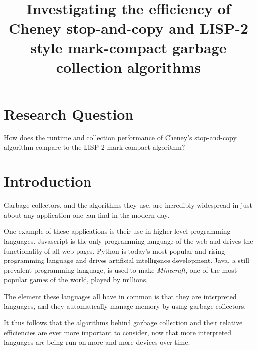 \documentclass[index]{subfiles}
\begin{document}
\title{Investigating the efficiency of Cheney stop-and-copy and LISP-2 style mark-compact garbage collection algorithms}
\date{}
\author{}
\maketitle

\section{Research Question}

How does the runtime and collection performance of Cheney's stop-and-copy algorithm compare to the LISP-2 mark-compact algorithm?

\section{Introduction}

Garbage collectors, and the algorithms they use, are incredibly widespread in just about any application one can find in the modern-day.

One example of these applications is their use in higher-level programming languages. Javascript is the only programming language of the web and drives the functionality of all web pages. Python is today's most popular and rising programming language and drives artificial intelligence development. Java, a still prevalent programming language, is used to make \textit{Minecraft}, one of the most popular games of the world, played by millions.

The element these languages all have in common is that they are interpreted languages, and they automatically manage memory by using garbage collectors.

It thus follows that the algorithms behind garbage collection and their relative efficiencies are ever more important to consider, now that more interpreted languages are being run on more and more devices over time. %
\end{document}
